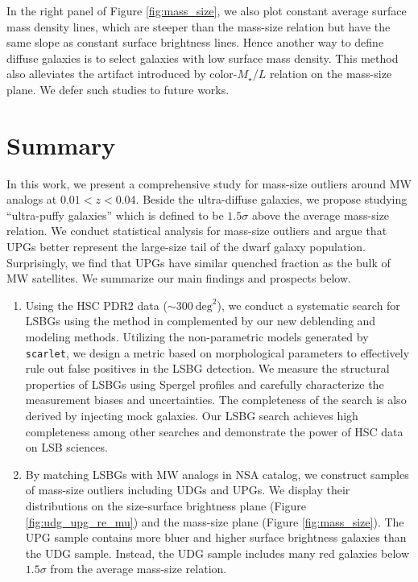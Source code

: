 \documentclass[twocolumn,astrosymb,twocolappendix]{aastex631}
\newcommand{\code}[1]{\texttt{#1}}
\begin{document}
\begin{CJK*}{UTF8}{gbsn}
In the right panel of Figure \ref{fig:mass_size}, we also plot constant average surface mass density lines, which are steeper than the mass-size relation but have the same slope as constant surface brightness lines. Hence another way to define diffuse galaxies is to select galaxies with low surface mass density. This method also alleviates the artifact introduced by color-$M_\star/L$ relation on the mass-size plane. We defer such studies to future works.  


\section{Summary}\label{sec:summary}
In this work, we present a comprehensive study for mass-size outliers around MW analogs at $0.01 < z < 0.04$. Beside the ultra-diffuse galaxies, we propose studying ``ultra-puffy galaxies'' which is defined to be $1.5\sigma$ above the average mass-size relation. We conduct statistical analysis for mass-size outliers and argue that UPGs better represent the large-size tail of the dwarf galaxy population. Surprisingly, we find that UPGs have similar quenched fraction as the bulk of MW satellites. We summarize our main findings and prospects below. 

\begin{enumerate}

    \item Using the HSC PDR2 data ($\sim 300\ \mathrm{deg}^{2}$), we conduct a systematic search for LSBGs using the method in \citet{Greco2018} complemented by our new deblending and modeling methods. Utilizing the non-parametric models generated by \code{scarlet}, we design a metric based on morphological parameters to effectively rule out false positives in the LSBG detection. We measure the structural properties of LSBGs using Spergel profiles and carefully characterize the measurement biases and uncertainties. The completeness of the search is also derived by injecting mock galaxies. Our LSBG search achieves high completeness among other searches and demonstrate the power of HSC data on LSB sciences. 
    
    \item By matching LSBGs with MW analogs in NSA catalog, we construct samples of mass-size outliers including UDGs and UPGs. We display their distributions on the size-surface brightness plane (Figure \ref{fig:udg_upg_re_mu}) and the mass-size plane (Figure \ref{fig:mass_size}). The UPG sample contains more bluer and higher surface brightness galaxies than the UDG sample. Instead, the UDG sample includes many red galaxies below $1.5\sigma$ from the average mass-size relation.
    

\end{enumerate}
\end{CJK*}
\end{document}
